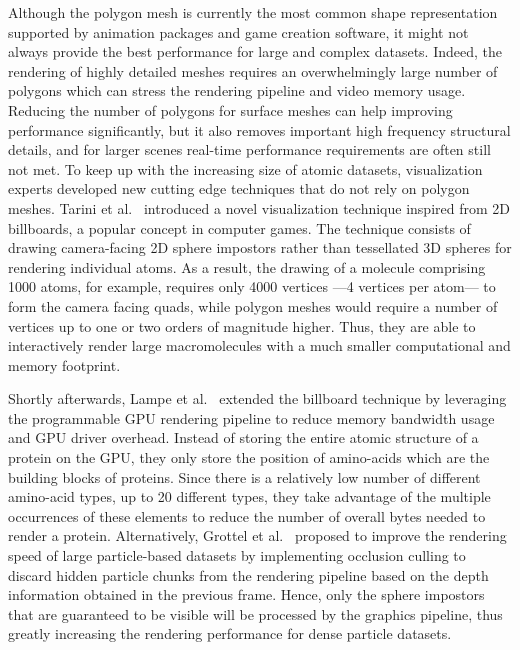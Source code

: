 Although the polygon mesh is currently the most common shape representation supported by animation packages and game creation software, it might not always provide the best performance for large and complex datasets.
Indeed, the rendering of highly detailed meshes requires an overwhelmingly large number of polygons which can stress the rendering pipeline and video memory usage.
Reducing the number of polygons for surface meshes can help improving performance significantly, but it also removes important high frequency structural details, and for larger scenes real-time performance requirements are often still not met.
To keep up with the increasing size of atomic datasets, visualization experts developed new cutting edge techniques that do not rely on polygon meshes.
Tarini et al.~\cite{tarini2006ambient} introduced a novel visualization technique inspired from 2D billboards, a popular concept in computer games.
The technique consists of drawing camera-facing 2D sphere impostors rather than tessellated 3D spheres for rendering individual atoms.
As a result, the drawing of a molecule comprising 1000 atoms, for example, requires only 4000 vertices ---4 vertices per atom--- to form the camera facing quads, while polygon meshes would require a number of vertices up to one or two orders of magnitude higher.
Thus, they are able to interactively render large macromolecules with a much smaller computational and memory footprint.

Shortly afterwards, Lampe et al.~\cite{lampe2007two} extended the billboard technique by leveraging the programmable GPU rendering pipeline to reduce memory bandwidth usage and GPU driver overhead. 
Instead of storing the entire atomic structure of a protein on the GPU, they only store the position of amino-acids which are the building blocks of proteins.
Since there is a relatively low number of different amino-acid types, up to 20 different types, they take advantage of the multiple occurrences of these elements to reduce the number of overall bytes needed to render a protein.
Alternatively, Grottel et al.~\cite{grottel2010coherent} proposed to improve the rendering speed of large particle-based datasets by implementing occlusion culling to discard hidden particle chunks from the rendering pipeline based on the depth information obtained in the previous frame.
Hence, only the sphere impostors that are guaranteed to be visible will be processed by the graphics pipeline, thus greatly increasing the rendering performance for dense particle datasets.

